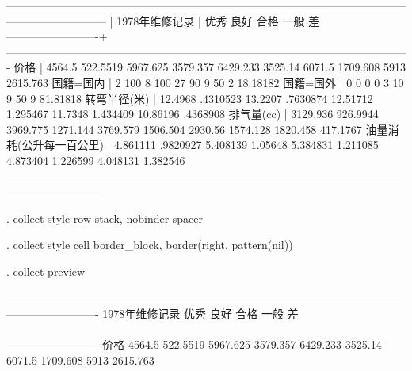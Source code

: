 \documentclass{ctexart}
\begin{document}
---------------------------------------------------------------------------------------------------------------------------------------
                         |                                                 1978年维修记录                                              
                         |          优秀                  良好                  合格                  一般                   差        
-------------------------+-------------------------------------------------------------------------------------------------------------
价格                     |    4564.5   522.5519   5967.625   3579.357   6429.233    3525.14     6071.5   1709.608       5913   2615.763
国籍=国内                |         2        100          8        100         27         90          9         50          2   18.18182
国籍=国外                |         0          0          0          0          3         10          9         50          9   81.81818
转弯半径(米)             |   12.4968   .4310523    13.2207   .7630874   12.51712   1.295467    11.7348   1.434409   10.86196   .4368908
排气量(cc)               |  3129.936   926.9944   3969.775   1271.144   3769.579   1506.504    2930.56   1574.128   1820.458   417.1767
油量消耗(公升每一百公里) |  4.861111   .9820927   5.408139    1.05648   5.384831   1.211085   4.873404   1.226599   4.048131   1.382546
---------------------------------------------------------------------------------------------------------------------------------------

. collect style row stack, nobinder spacer

. collect style cell border_block, border(right, pattern(nil))

. collect preview

-------------------------------------------------------------------------------------------------------------------------------------
                                                                         1978年维修记录                                              
                                  优秀                  良好                  合格                  一般                   差        
-------------------------------------------------------------------------------------------------------------------------------------
价格                        4564.5   522.5519   5967.625   3579.357   6429.233    3525.14     6071.5   1709.608       5913   2615.763
                                                                                                                                     
\end{document}
